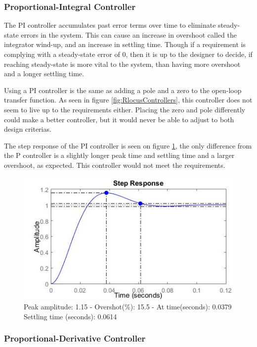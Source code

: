 \subsubsection{Proportional-Integral Controller}

The PI controller accumulates past error terms over time to eliminate steady-state errors in the system. This can cause an increase in overshoot called the integrator wind-up, and an increase in settling time. Though if a requirement is complying with a steady-state error of 0, then it is up to the designer to decide, if reaching steady-state is more vital to the system, than having more overshoot and a longer settling time.\par

Using a PI controller is the same as adding a pole and a zero to the open-loop transfer function. As seen in figure \ref{fig:RlocusControllers}, this controller does not seem to live up to the requirements either. Placing the zero and pole differently could make a better controller, but it would never be able to adjust to both design criterias.\par

The step response of the PI controller is seen on figure \ref{fig:PIStep}, the only difference from the P controller is a slightly longer peak time and settling time and a larger overshoot, as expected. This controller would not meet the requirements. 

\begin{figure}[h!]
\centering
\includegraphics[scale=0.7]{Billeder/PIStep.jpg}
\caption{ Peak amplitude: 1.15 - Overshot(\%): 15.5 - At time(seconds): 0.0379
		 Settling time (seconds): 0.0614 }
\label{fig:PIStep}
\end{figure}

\subsubsection{Proportional-Derivative Controller}

